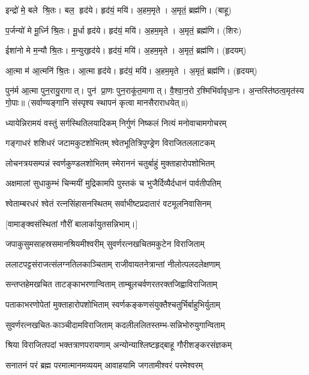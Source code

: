    इन्द्रो॑ मे॒ बले श्रि॒तः।   बल॒ हृद॑ये।   हृद॑यं॒ मयि॑।   अ॒हम॒मृते।   अ॒मृतं॒ ब्रह्म॑णि। (बाहू)

   प॒र्जन्यो॑ मे मू॒र्ध्नि श्रि॒तः।   मू॒र्धा हृद॑ये।   हृद॑यं॒ मयि॑।   अ॒हम॒मृते।   अ॒मृतं॒ ब्रह्म॑णि। (शिरः)

   ईशा॑नो मे म॒न्यौ श्रि॒तः।   म॒न्युर्‌हृद॑ये।   हृद॑यं॒ मयि॑।    अ॒हम॒मृते।   अ॒मृतं॒ ब्रह्म॑णि। (हृदयम्)

   आ॒त्मा म॑ आ॒त्मनि॑ श्रि॒तः।   आ॒त्मा हृद॑ये।   हृद॑यं॒ मयि॑।   अ॒हम॒मृते।   अ॒मृतं॒ ब्रह्म॑णि।
(हृदयम्)

   पुन॑र्म आ॒त्मा पुन॒रायु॒रागात्।   पुन॑ प्रा॒णः पुन॒राकू॑त॒मागात्।   वै॒श्वा॒न॒रो र॒श्मिभि॑र्वावृधा॒नः।   अ॒न्तस्ति॑ष्ठत्व॒मृत॑स्य गो॒पाः॥ (सर्वाण्यङ्गानि संस्पृश्य स्थापनं कृत्वा मानसैराराधयेत्॥)
{\small \closesection}


\twolineshloka
{ध्यायेन्निरामयं वस्तुं सर्गस्थितिलयादिकम्}
{निर्गुणं निष्कलं नित्यं मनोवाचामगोचरम्}

\twolineshloka
{गङ्गाधरं शशिधरं जटामकुटशोभितम्}
{श्वेतभूतित्रिपुण्ड्रेण विराजितललाटकम्}

\twolineshloka
{लोचनत्रयसम्पन्नं स्वर्णकुण्डलशोभितम्}
{स्मेराननं चतुर्बाहुं मुक्ताहारोपशोभितम्}

\twolineshloka
{अक्षमालां सुधाकुम्भं चिन्मयीं मुद्रिकामपि}
{पुस्तकं च भुजैर्दिव्यैर्दधानं पार्वतीपतिम्}

\twolineshloka
{श्वेताम्बरधरं श्वेतं रत्नसिंहासनस्थितम्}
{सर्वाभीष्टप्रदातारं वटमूलनिवासिनम्}

\centerline{[वामाङ्क्वसंस्थितां गौरीं बालार्कायुतसन्निभाम्।]}

\twolineshloka
{जपाकुसुमसाहस्रसमानश्रियमीश्वरीम्}
{सुवर्णरत्नखचितमकुटेन विराजिताम्}

\twolineshloka
{ललाटपट्टसंराजत्संलग्नतिलकाञ्चिताम्}
{राजीवायतनेत्रान्तां नीलोत्पलदलेक्षणाम्}

\twolineshloka
{सन्तप्तहेमखचित ताटङ्काभरणान्विताम्}
{ताम्बूलचर्वणरतरक्तजिह्वाविराजिताम्}

\twolineshloka
{पताकाभरणोपेतां मुक्ताहारोपशोभिताम्}
{स्वर्णकङ्कणसंयुक्तैश्चतुर्भिर्बाहुभिर्युताम्}

\twolineshloka
{सुवर्णरत्नखचित-काञ्चीदामविराजिताम्}
{कदलीललितस्तम्भ-सन्निभोरुयुगान्विताम्}

\twolineshloka
{श्रिया विराजितपदां भक्तत्राणपरायणाम्}
{अन्योन्याश्लिष्टहृद्बाहू गौरीशङ्करसंज्ञकम्}

\twolineshloka
{सनातनं परं ब्रह्म परमात्मानमव्ययम्}
{आवाहयामि जगतामीश्वरं परमेश्वरम्}

